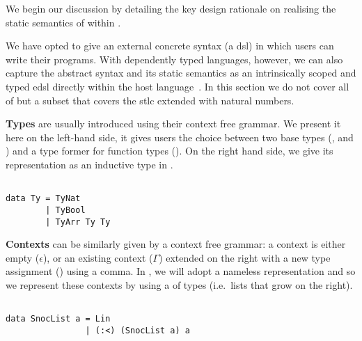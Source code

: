We begin our discussion by detailing the key design rationale on
realising the static semantics of \Velo{} within \Idris{}.

We have opted to give \Velo{} an external concrete syntax (a \ac{dsl})
in which users can write their programs.
%
With dependently typed languages, however, we can also capture
the abstract syntax and its static semantics as an intrinsically
scoped and typed \ac{edsl}
directly within the host language~\cite{Augustsson1999edt}.
%
In this section we do not cover all of \Velo{} but a subset that covers the \ac{stlc} extended with natural numbers.



\textbf{Types} are usually introduced using their context free grammar.
%
We present it here on the left-hand side, it gives users the choice between
two base types (\TyNat, and \TyBool) and a type former for function types
(\TyFunc{\cdot}{\cdot}).
%
On the right hand side, we give its representation as an inductive
type in \Idris{}.

\begin{center}
\begin{minipage}{0.45\textwidth}
\syntaxtypes
\end{minipage}\hfill
\begin{minipage}{0.45\textwidth}
\begin{Verbatim}

data Ty = TyNat
        | TyBool
        | TyArr Ty Ty
\end{Verbatim}
\end{minipage}
\end{center}

\textbf{Contexts} can be similarly given by a context free grammar:
a context is either empty ($\epsilon$), or an existing context ($\Gamma$)
extended on the right with a new type assignment () using a comma.
%
In \Idris{}, we will adopt a nameless representation and so we represent
these contexts by using a  of types
(i.e.\ lists that grow on the right).

\begin{center}
\begin{minipage}{0.35\textwidth}
\syntaxcontexts
\end{minipage}\hfill
\begin{minipage}{0.55\textwidth}
\begin{Verbatim}

data SnocList a = Lin
                | (:<) (SnocList a) a
\end{Verbatim}
\end{minipage}
\end{center}

